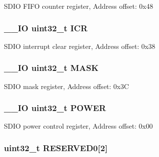 S\-D\-I\-O F\-I\-F\-O counter register, Address offset\-: 0x48 \hypertarget{struct_s_d_i_o___type_def_a0a8c8230846fd8ff154b9fde8dfa0399}{
\subsubsection[{I\-C\-R}]{\setlength{\rightskip}{0pt plus 5cm}\-\_\-\-\_\-\-I\-O uint32\-\_\-t I\-C\-R}}\label{struct_s_d_i_o___type_def_a0a8c8230846fd8ff154b9fde8dfa0399}
S\-D\-I\-O interrupt clear register, Address offset\-: 0x38 \hypertarget{struct_s_d_i_o___type_def_a5c955643593b4aedbe9f84f054d26522}{
\subsubsection[{M\-A\-S\-K}]{\setlength{\rightskip}{0pt plus 5cm}\-\_\-\-\_\-\-I\-O uint32\-\_\-t M\-A\-S\-K}}\label{struct_s_d_i_o___type_def_a5c955643593b4aedbe9f84f054d26522}
S\-D\-I\-O mask register, Address offset\-: 0x3\-C \hypertarget{struct_s_d_i_o___type_def_a65bff76f3af24c37708a1006d54720c7}{
\subsubsection[{P\-O\-W\-E\-R}]{\setlength{\rightskip}{0pt plus 5cm}\-\_\-\-\_\-\-I\-O uint32\-\_\-t P\-O\-W\-E\-R}}\label{struct_s_d_i_o___type_def_a65bff76f3af24c37708a1006d54720c7}
S\-D\-I\-O power control register, Address offset\-: 0x00 \hypertarget{struct_s_d_i_o___type_def_a8be676577db129a84a9a2689519a8502}{
\subsubsection[{R\-E\-S\-E\-R\-V\-E\-D0}]{\setlength{\rightskip}{0pt plus 5cm}uint32\-\_\-t R\-E\-S\-E\-R\-V\-E\-D0\mbox{[}2\mbox{]}}}\label{struct_s_d_i_o___type_def_a8be676577db129a84a9a2689519a8502}
